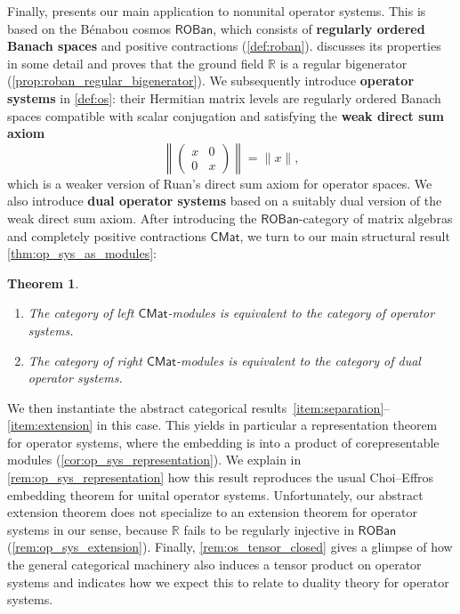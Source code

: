 \documentclass[11pt,onecolumn]{article}
\newcommand{\R}{\mathbb{R}}
\newcommand{\ROBan}{\mathsf{ROBan}}
\theoremstyle{plain}
\newtheorem*{theorem*}{Theorem}
\theoremstyle{remark}
\theoremstyle{definition}
\begin{document}
Finally,  presents our main application to nonunital operator systems.
This is based on the B\'enabou cosmos $\ROBan$, which consists of \textbf{regularly ordered Banach spaces} and positive contractions (\cref{def:roban}).
 discusses its properties in some detail and proves that the ground field $\R$ is a regular bigenerator (\cref{prop:roban_regular_bigenerator}).
We subsequently introduce \textbf{operator systems} in \cref{def:os}: their Hermitian matrix levels are regularly ordered Banach spaces compatible with scalar conjugation and satisfying the \textbf{weak direct sum axiom} 
\[
	\left\|
	\begin{pmatrix}
		x & 0 \\
		0 & x
	\end{pmatrix}
	\right\|
	=
	\|x\|,
\]
which is a weaker version of Ruan's direct sum axiom for operator spaces.
We also introduce \textbf{dual operator systems} based on a suitably dual version of the weak direct sum axiom.
After introducing the $\ROBan$-category of matrix algebras and completely positive contractions $\mathsf{CMat}$,
we turn to our main structural result \cref{thm:op_sys_as_modules}:
\begin{theorem*}
	\begin{enumerate}
		\item The category of left $\mathsf{CMat}$-modules is equivalent to the category of operator systems.
		\item The category of right $\mathsf{CMat}$-modules is equivalent to the category of dual operator systems.
	\end{enumerate}
\end{theorem*}
We then instantiate the abstract categorical results~\ref{item:separation}--\ref{item:extension} in this case.
This yields in particular a representation theorem for operator systems, where the embedding is into a product of corepresentable modules (\cref{cor:op_sys_representation}).
We explain in \cref{rem:op_sys_representation} how this result reproduces the usual Choi--Effros embedding theorem for unital operator systems.
Unfortunately, our abstract extension theorem does not specialize to an extension theorem for operator systems in our sense,
because $\R$ fails to be regularly injective in $\ROBan$ (\cref{rem:op_sys_extension}).
Finally, \cref{rem:os_tensor_closed} gives a glimpse of how the general categorical machinery also induces a tensor product on operator systems and indicates how we expect this to relate to duality theory for operator systems.
\end{document}
